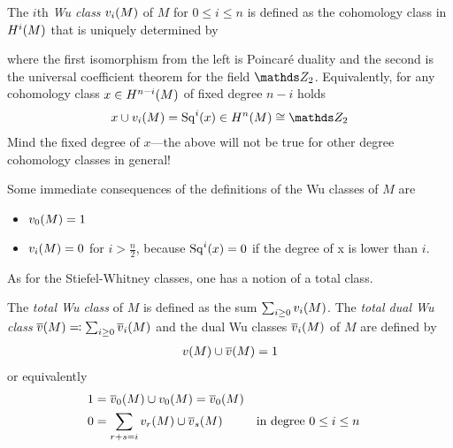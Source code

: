 \begin{Def}\label{def:wuclasses}
  The $i$th \emph{Wu class} ${v_{i}}(M)$ of $M$ for $0\leq i\leq n$ is defined
  as the cohomology class in $H^i(M)$ that is uniquely determined by
  \begin{center}
  \end{center}
  where the first isomorphism from the left is Poincaré duality
  and the second is the universal coefficient theorem
  for the field $\Zmod2$.
  Equivalently, for any cohomology class $x\in H^{n-i}(M)$ of fixed
  degree $n-i$ holds
  \begin{gather*}
    x\cup \v{i}{M} = \Sq i(x) \in \H^n(M) \cong \Zmod2
  \end{gather*}
  Mind the fixed degree of $x$---the above will not be true for other
  degree cohomology classes in general!
\end{Def}

\begin{Rem}
  Some immediate consequences of the definitions of the Wu classes of
  $M$ are
  \begin{itemize}
  \item ${v_{0}}(M) = 1$
  \item ${v_{i}}(M) = 0$ for $i>\frac n 2$, because $\mathrm{Sq}^{i}(x) = 0$ if the
    degree of x is lower than $i$.
  \end{itemize}
\end{Rem}

As for the Stiefel-Whitney classes, one has a notion of a total class.
\begin{Def}\label{def:dualwuclasses}
  The \emph{total Wu class} of $M$ is defined as the sum
  $\sum_{i\geq0}{v_{i}}(M)$. The \emph{total dual Wu class}
  ${\overline{v}}(M)\eqqcolon \sum_{i\geq 0}{\overline{v}_{i}}(M)$
  and the dual Wu classes ${\overline{v}_{i}}(M)$
  of $M$ are defined by
  \begin{gather*}
    {v}(M) \cup {\overline{v}}(M) = 1
  \end{gather*}
  or equivalently
  \begin{align*}
    1 &= {\overline{v}_{0}}(M) \cup {v_{0}}(M) = {\overline{v}_{0}}(M) \\
    0 &= \sum_{r+s=i}{v_{r}}(M)\cup{\overline{v}_{s}}(M)
      &&\text{in degree $0\leq i\leq n$}
  \end{align*}
\end{Def}

